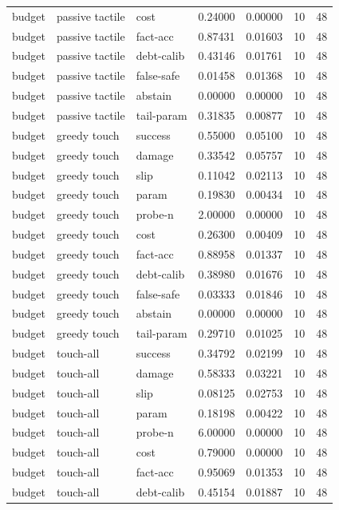 \documentclass{article}
\begin{document}
\begin{center}
\begin{longtable}{lllllll}
budget & passive tactile & cost & 0.24000 & 0.00000 & 10 & 48 \\
budget & passive tactile & fact-acc & 0.87431 & 0.01603 & 10 & 48 \\
budget & passive tactile & debt-calib & 0.43146 & 0.01761 & 10 & 48 \\
budget & passive tactile & false-safe & 0.01458 & 0.01368 & 10 & 48 \\
budget & passive tactile & abstain & 0.00000 & 0.00000 & 10 & 48 \\
budget & passive tactile & tail-param & 0.31835 & 0.00877 & 10 & 48 \\
budget & greedy touch & success & 0.55000 & 0.05100 & 10 & 48 \\
budget & greedy touch & damage & 0.33542 & 0.05757 & 10 & 48 \\
budget & greedy touch & slip & 0.11042 & 0.02113 & 10 & 48 \\
budget & greedy touch & param & 0.19830 & 0.00434 & 10 & 48 \\
budget & greedy touch & probe-n & 2.00000 & 0.00000 & 10 & 48 \\
budget & greedy touch & cost & 0.26300 & 0.00409 & 10 & 48 \\
budget & greedy touch & fact-acc & 0.88958 & 0.01337 & 10 & 48 \\
budget & greedy touch & debt-calib & 0.38980 & 0.01676 & 10 & 48 \\
budget & greedy touch & false-safe & 0.03333 & 0.01846 & 10 & 48 \\
budget & greedy touch & abstain & 0.00000 & 0.00000 & 10 & 48 \\
budget & greedy touch & tail-param & 0.29710 & 0.01025 & 10 & 48 \\
budget & touch-all & success & 0.34792 & 0.02199 & 10 & 48 \\
budget & touch-all & damage & 0.58333 & 0.03221 & 10 & 48 \\
budget & touch-all & slip & 0.08125 & 0.02753 & 10 & 48 \\
budget & touch-all & param & 0.18198 & 0.00422 & 10 & 48 \\
budget & touch-all & probe-n & 6.00000 & 0.00000 & 10 & 48 \\
budget & touch-all & cost & 0.79000 & 0.00000 & 10 & 48 \\
budget & touch-all & fact-acc & 0.95069 & 0.01353 & 10 & 48 \\
budget & touch-all & debt-calib & 0.45154 & 0.01887 & 10 & 48 \\
\bottomrule
\end{longtable}
\renewcommand{\arraystretch}{1.0}
\end{center}
\end{document}
